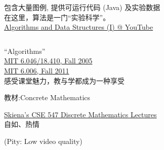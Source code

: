 \begin{frame}{}
  \begin{columns}
  \end{columns}

  \vspace{0.50cm}
  \begin{center}
    包含大量图例, 提供可运行代码 (Java) 及实验数据 \\[8pt]
    在这里，算法是一门``实验科学''。\\[10pt]

    \href{https://www.youtube.com/playlist?list=PLxc4gS-_A5VDXUIOPkJkwQKYiT2T1t0I8}{Algorithms and Data Structures (I) @ YouTube}
  \end{center}
\end{frame}

\begin{frame}{}
  \begin{columns}
  \end{columns}

  \vspace{0.50cm}
  \begin{center}
    ``Algorithms''\\[4pt]
    \href{http://open.163.com/special/opencourse/algorithms.html}{MIT 6.046/18.410, Fall 2005}\\[3pt]
    \href{https://ocw.mit.edu/courses/electrical-engineering-and-computer-science/6-006-introduction-to-algorithms-fall-2011/lecture-videos/}{MIT 6.006, Fall 2011}\\[10pt]
    
    感受课堂魅力，教与学都成为一种享受
  \end{center}
\end{frame}

\begin{frame}{}

  \begin{center}
    教材:Concrete Mathematics

    \href{http://www3.cs.stonybrook.edu/~algorith/math-video/}{Skiena's CSE 547 Discrete Mathematics Lectures} \\[8pt]

    自如、热情

    {\small (Pity: Low video quality)}
  \end{center}
\end{frame}

